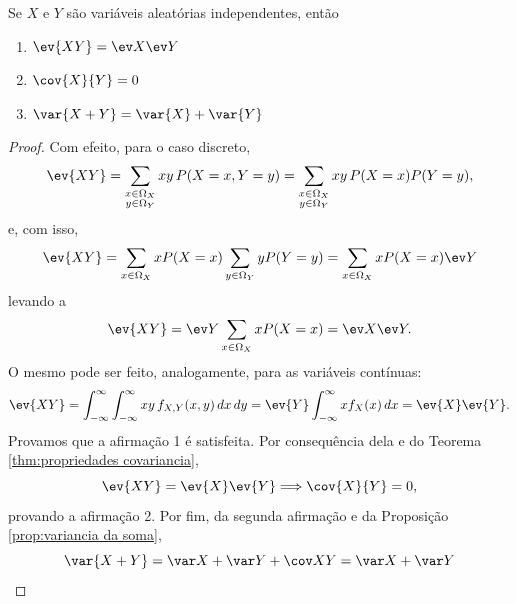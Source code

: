 \begin{thm:covariancia independentes}
Se $X$ e $Y$ são variáveis aleatórias independentes, então
\begin{enumerate}
\item $\ev{XY} = \ev X \ev Y$
\item $\cov{X}{Y} = 0$
\item $\var{X + Y} = \var{X} + \var{Y}$
\end{enumerate}
\end{thm:covariancia independentes}
\begin{proof}
Com efeito, para o caso discreto,
\[
    \ev{XY} = \sum_{\substack{ x \in \Omega_X \\ y \in \Omega_Y}} xy\,P(X = x, Y = y) =
    \sum_{\substack{ x \in \Omega_X \\ y \in \Omega_Y}} xy\,P(X = x)P(Y = y),
\]
e, com isso,
\[
    \ev{XY} = \sum_{x \in \Omega_X} x P(X = x) \sum_{y \in \Omega_Y} y P(Y = y) =
    \sum_{x \in \Omega_X} x P(X = x) \ev Y
\]
levando a
\[
    \ev{XY} = \ev Y \sum_{x \in \Omega_X} x P(X = x) = \ev X \ev Y.
\]
O mesmo pode ser feito, analogamente, para as variáveis contínuas:
\[
    \ev{XY} = \int_{-\infty}^\infty \int_{-\infty}^\infty xy\, f_{X, Y}(x, y)\,dx\,dy =
    \ev{Y} \int_{-\infty}^\infty x f_X(x)\,dx = \ev{X}\ev{Y}.
\]
Provamos que a afirmação 1 é satisfeita.
Por consequência dela e do Teorema \ref{thm:propriedades covariancia},
\[
    \ev{XY} = \ev{X}\ev{Y} \Longrightarrow \cov{X}{Y} = 0,
\]
provando a afirmação 2.
Por fim, da segunda afirmação e da Proposição \ref{prop:variancia da soma},
\[
    \var{X + Y} = \var X + \var Y + \cov XY  = \var X + \var Y
\]
\end{proof}
